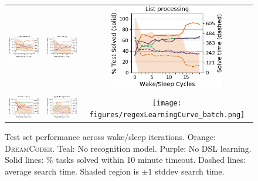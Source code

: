 \documentclass{article}
\newcommand{\systemEnding}{\textsc{DreamCoder}}
\begin{document}
\begin{figure}
  \begin{tabular}{ccc}
    \includegraphics[width = 5cm]{figures/logoLearningCurve_batch.png}&
    \includegraphics[width = 5cm]{figures/textLearningCurve_batch.png}&
    \includegraphics[width = 5cm]{figures/listLearningCurve_batch.png}\\\\
    \includegraphics[width = 5cm]{figures/towerLearningCurve_batch.png}&
    \includegraphics[width = 5cm]{figures/rationalLearningCurve_batch.png}&
    \texttt{[image: figures/regexLearningCurve\_batch.png]}
  \end{tabular}
  \caption{Test set performance across wake/sleep iterations. Orange: \systemEnding. Teal: No recognition model. Purple: No DSL learning. Solid lines: \% tasks solved within 10 minute timeout. Dashed lines: average search time. Shaded region is $\pm 1$ stddev search time.}\label{learningCurves}
\end{figure}
\end{document}
